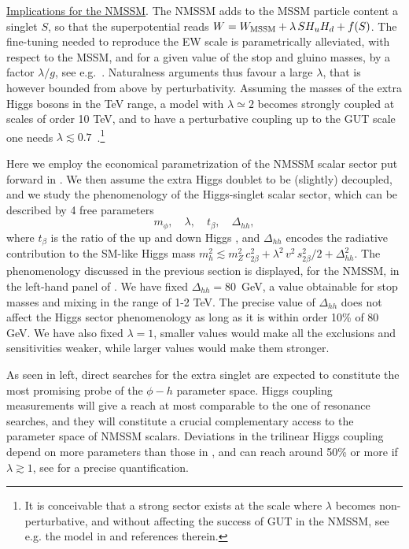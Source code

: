\underline{Implications for the NMSSM}. The NMSSM adds to the MSSM particle content a singlet $S$, so that the superpotential reads $W = W_{\rm \tiny MSSM} + \lambda\,S H_u H_d + f(S)$.
The fine-tuning needed to reproduce the EW scale is parametrically alleviated, with respect to the MSSM, and for a given value of the stop and gluino masses, by a factor $\lambda/g$, see e.g.~.
Naturalness arguments thus favour a large $\lambda$, that is however bounded from above by perturbativity.
Assuming the masses of the extra Higgs bosons in the TeV range, a model with $\lambda \simeq 2$ becomes strongly coupled at scales of order 10 TeV, and to have a perturbative coupling up to the GUT scale one needs $\lambda \lesssim 0.7$~\cite{Espinosa:1991gr}.\footnote{It is conceivable that a strong sector exists at the scale where $\lambda$ becomes non-perturbative, and without affecting the success of GUT in the NMSSM, see e.g. the model in  and references therein.}

Here we employ the economical parametrization of the NMSSM scalar sector put forward in .
We then assume the extra Higgs doublet to be (slightly) decoupled, and we study the phenomenology of the Higgs-singlet scalar sector, which can be described by 4 free parameters
\begin{equation}
m_\phi, \quad \lambda,\quad t_\beta, \quad \Delta_{hh},
\label{eq:singlets_NMSSMpars}
\end{equation}
where $t_\beta$ is the ratio of the up and down Higgs \vevs, and $\Delta_{hh}$ encodes the radiative contribution to the SM-like Higgs mass $m_h^2 \lesssim m_Z^2 \,c^2_{2\beta} + \lambda^2 \,v^2\,s^2_{2\beta}/2 + \Delta_{hh}^2$. %
The phenomenology discussed in the previous section is displayed, for the NMSSM, in the left-hand panel of .
We have fixed $\Delta_{hh} = 80$~GeV, a value obtainable for stop masses and mixing in the range of 1-2 TeV.
The precise value of $\Delta_{hh}$ does not affect the Higgs sector phenomenology as long as it is within order 10\% of 80 GeV. We have also fixed $\lambda =1$, smaller values would make all the exclusions and sensitivities weaker, while larger values would make them stronger.

As seen in  left, direct searches for the extra singlet are expected to constitute the most promising probe of the $\phi - h$ parameter space. %
Higgs coupling measurements will give a reach at most comparable to the one of resonance searches, and they will constitute a crucial complementary access to the parameter space of NMSSM scalars. Deviations in the trilinear Higgs coupling depend on more parameters than those in , and can reach around 50\% or more if $\lambda \gtrsim 1$, see  for a precise quantification.

